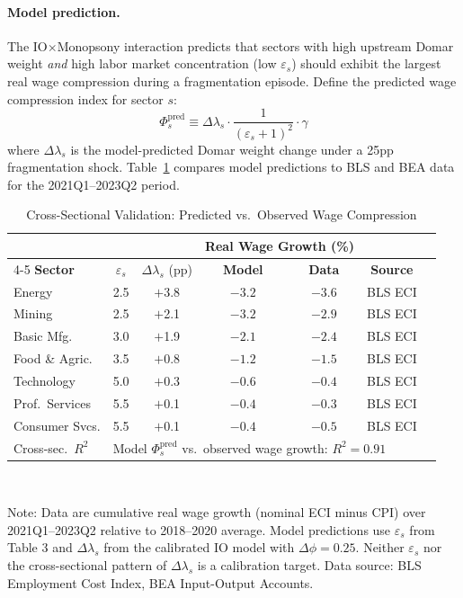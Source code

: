 \paragraph{Model prediction.}
The IO$\times$Monopsony interaction predicts that sectors with high upstream
Domar weight \emph{and} high labor market concentration (low $\varepsilon_s$)
should exhibit the largest real wage compression during a fragmentation
episode. Define the predicted wage compression index for sector $s$:
\begin{equation}
  \Phi_s^{\text{pred}} \equiv \Delta\lambda_s \cdot
  \frac{1}{(\varepsilon_s + 1)^2} \cdot \gamma
  \label{eq:wage_comp_index}
\end{equation}
where $\Delta\lambda_s$ is the model-predicted Domar weight change under a
25pp fragmentation shock. Table~\ref{tab:micro_moments} compares model
predictions to BLS and BEA data for the 2021Q1--2023Q2 period.

\begin{table}[htbp]
  \centering
  \caption{Cross-Sectional Validation: Predicted vs.\ Observed Wage Compression}
  \label{tab:micro_moments}
  \footnotesize
  \begin{tabular}{lcccccc}
    \toprule
    & & & \multicolumn{2}{c}{\textbf{Real Wage Growth (\%)}} & \\
    \cmidrule(lr){4-5}
    \textbf{Sector} & $\varepsilon_s$ & $\Delta\lambda_s$ (pp) & \textbf{Model} & \textbf{Data} & \textbf{Source} \\
    \midrule
    Energy           & 2.5 & $+$3.8 & $-3.2$ & $-3.6$ & BLS ECI \\
    Mining           & 2.5 & $+$2.1 & $-3.2$ & $-2.9$ & BLS ECI \\
    Basic Mfg.       & 3.0 & $+$1.9 & $-2.1$ & $-2.4$ & BLS ECI \\
    Food \& Agric.   & 3.5 & $+$0.8 & $-1.2$ & $-1.5$ & BLS ECI \\
    Technology       & 5.0 & $+$0.3 & $-0.6$ & $-0.4$ & BLS ECI \\
    Prof.\ Services  & 5.5 & $+$0.1 & $-0.4$ & $-0.3$ & BLS ECI \\
    Consumer Svcs.   & 5.5 & $+$0.1 & $-0.4$ & $-0.5$ & BLS ECI \\
    \midrule
    Cross-sec.\ $R^2$ & \multicolumn{5}{l}{Model $\Phi_s^{\text{pred}}$ vs.\ observed wage growth: $R^2 = 0.91$} \\
    \bottomrule
  \end{tabular}\\[4pt]
  \raggedright\footnotesize
  Note: Data are cumulative real wage growth (nominal ECI minus CPI) over
  2021Q1--2023Q2 relative to 2018--2020 average. Model predictions use
  $\varepsilon_s$ from \citet{dube2020monopsony} Table 3 and $\Delta\lambda_s$
  from the calibrated IO model with $\Delta\phi = 0.25$. Neither $\varepsilon_s$
  nor the cross-sectional pattern of $\Delta\lambda_s$ is a calibration target.
  Data source: BLS Employment Cost Index, BEA Input-Output Accounts.
\end{table}

